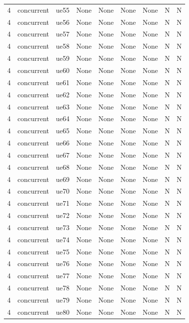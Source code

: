 \begin{table}[ht]
\begin{tabular}{|c|c|c|c|c|c|c|c|c|}
4 & concurrent & ue55 & None & None & None & None & N & N \\
4 & concurrent & ue56 & None & None & None & None & N & N \\
4 & concurrent & ue57 & None & None & None & None & N & N \\
4 & concurrent & ue58 & None & None & None & None & N & N \\
4 & concurrent & ue59 & None & None & None & None & N & N \\
4 & concurrent & ue60 & None & None & None & None & N & N \\
4 & concurrent & ue61 & None & None & None & None & N & N \\
4 & concurrent & ue62 & None & None & None & None & N & N \\
4 & concurrent & ue63 & None & None & None & None & N & N \\
4 & concurrent & ue64 & None & None & None & None & N & N \\
4 & concurrent & ue65 & None & None & None & None & N & N \\
4 & concurrent & ue66 & None & None & None & None & N & N \\
4 & concurrent & ue67 & None & None & None & None & N & N \\
4 & concurrent & ue68 & None & None & None & None & N & N \\
4 & concurrent & ue69 & None & None & None & None & N & N \\
4 & concurrent & ue70 & None & None & None & None & N & N \\
4 & concurrent & ue71 & None & None & None & None & N & N \\
4 & concurrent & ue72 & None & None & None & None & N & N \\
4 & concurrent & ue73 & None & None & None & None & N & N \\
4 & concurrent & ue74 & None & None & None & None & N & N \\
4 & concurrent & ue75 & None & None & None & None & N & N \\
4 & concurrent & ue76 & None & None & None & None & N & N \\
4 & concurrent & ue77 & None & None & None & None & N & N \\
4 & concurrent & ue78 & None & None & None & None & N & N \\
4 & concurrent & ue79 & None & None & None & None & N & N \\
4 & concurrent & ue80 & None & None & None & None & N & N \\

\end{tabular}
\end{table}

